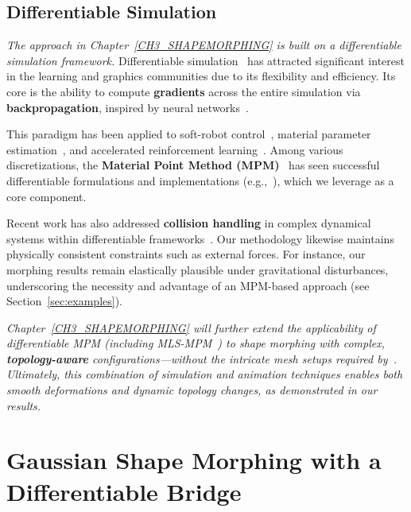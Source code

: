 \subsection{Differentiable Simulation}
    \emph{The approach in Chapter~\ref{CH3_SHAPEMORPHING} is built on a differentiable simulation framework.} Differentiable simulation~\citep[see, e.g.,][]{coros2021differentiable} has attracted significant interest in the learning and graphics communities due to its flexibility and efficiency. Its core is the ability to compute \textbf{gradients} across the entire simulation via \textbf{backpropagation}, inspired by neural networks~\citep{2020-DiffPhysicsSim}.
    
    This paradigm has been applied to soft-robot control~\citep{2018-ChainQueen, 2019-DiffTaichi}, material parameter estimation~\citep{2019-DiffCloth, 2022-DiffSoftMultiBody}, and accelerated reinforcement learning~\citep{2021-PODS, 2022-DiffSimRL}. Among various discretizations, the \textbf{Material Point Method (MPM)}~\citep{sulsky1994particle, jiang2016material} has seen successful differentiable formulations and implementations (e.g.,~\citep{2018-ChainQueen}), which we leverage as a core component.
    
    Recent work has also addressed \textbf{collision handling} in complex dynamical systems within differentiable frameworks~\citep{qiao2020scalable}. Our methodology likewise maintains physically consistent constraints such as external forces. For instance, our morphing results remain elastically plausible under gravitational disturbances, underscoring the necessity and advantage of an MPM-based approach (see Section~\ref{sec:examples}).
    
    \emph{Chapter~\ref{CH3_SHAPEMORPHING} will further extend the applicability of differentiable MPM (including MLS-MPM~\citep{2018-MLSMPM}) to shape morphing with complex, \textbf{topology-aware} configurations---without the intricate mesh setups required by~\citep{10.1145/3130800.3130820}. Ultimately, this combination of simulation and animation techniques enables both smooth deformations and dynamic topology changes, as demonstrated in our results.}

\section{Gaussian Shape Morphing with a Differentiable Bridge}
